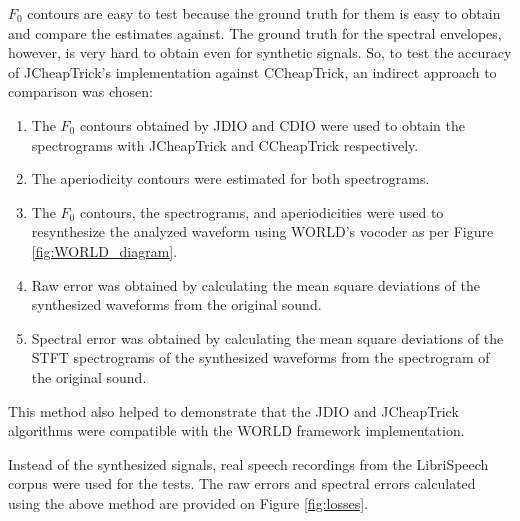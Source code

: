 \documentclass[a4paper]{article}
\begin{document}
$F_0$ contours are easy to test because the ground truth for them is easy to obtain and compare the estimates against. The ground truth for the spectral envelopes, however, is very hard to obtain even for synthetic signals. So, to test the accuracy of JCheapTrick's implementation against CCheapTrick, an indirect approach to comparison was chosen:
\begin{enumerate}
    \item The $F_0$ contours obtained by JDIO and CDIO were used to obtain the spectrograms with JCheapTrick and CCheapTrick respectively.
    \item The aperiodicity contours were estimated for both spectrograms.
    \item The $F_0$ contours, the spectrograms, and aperiodicities were used to resynthesize the analyzed waveform using WORLD's vocoder as per Figure \ref{fig:WORLD_diagram}.
    \item Raw error was obtained by calculating the mean square deviations of the synthesized waveforms from the original sound.
    \item Spectral error was obtained by calculating the mean square deviations of the STFT spectrograms of the synthesized waveforms from the spectrogram of the original sound.
\end{enumerate}
This method also helped to demonstrate that the JDIO and JCheapTrick algorithms were compatible with the WORLD framework implementation.

Instead of the synthesized signals, real speech recordings from the LibriSpeech corpus were used for the tests. The raw errors and spectral errors calculated using the above method are provided on Figure \ref{fig:losses}.
\end{document}
